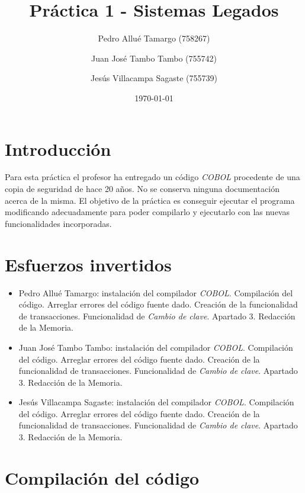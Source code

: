 \documentclass[10pt,a4paper]{article}
\begin{document}
\begin{titlepage}
\title{\textbf{{\Huge Práctica 1 - Sistemas Legados}}}
\author{
	Pedro Allué Tamargo (758267)
	\and
	Juan José Tambo Tambo (755742)
	\and
	Jesús Villacampa Sagaste (755739)
}
\date{\today}
\clearpage\maketitle
\thispagestyle{empty}
\tableofcontents
\listoffigures
\end{titlepage}

\section{Introducción}

Para esta práctica el profesor ha entregado un código \emph{COBOL} procedente de una copia de seguridad de hace 20 años. No se conserva ninguna documentación acerca de la misma. El objetivo de la práctica es conseguir ejecutar el programa modificando adecuadamente para poder compilarlo y ejecutarlo con las nuevas funcionalidades incorporadas.

\section{Esfuerzos invertidos}

\begin{itemize}
\item Pedro Allué Tamargo: instalación del compilador \emph{COBOL}. Compilación del código. Arreglar errores del código fuente dado. Creación de la funcionalidad de transacciones. Funcionalidad de \emph{Cambio de clave}. Apartado 3. Redacción de la Memoria.
\item Juan José Tambo Tambo: instalación del compilador \emph{COBOL}. Compilación del código. Arreglar errores del código fuente dado. Creación de la funcionalidad de transacciones. Funcionalidad de \emph{Cambio de clave}. Apartado 3. Redacción de la Memoria.
\item Jesús Villacampa Sagaste: instalación del compilador \emph{COBOL}. Compilación del código. Arreglar errores del código fuente dado. Creación de la funcionalidad de transacciones. Funcionalidad de \emph{Cambio de clave}. Apartado 3. Redacción de la Memoria.
\end{itemize}


\section{Compilación del código}
\end{document}
